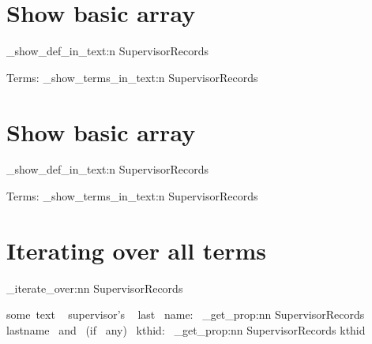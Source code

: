 \documentclass{article}
\begin{document}
\section{Show basic array}
\ExplSyntaxOn
\starray_show_def_in_text:n {SupervisorRecords}\\
\par Terms:
\starray_show_terms_in_text:n {SupervisorRecords}\\
\ExplSyntaxOff


\section{Show basic array}
\ExplSyntaxOn
\starray_show_def_in_text:n {SupervisorRecords}\\
\par Terms:
\starray_show_terms_in_text:n {SupervisorRecords}\\
\ExplSyntaxOff


\section{Iterating over all terms}
\ExplSyntaxOn
\starray_iterate_over:nn {SupervisorRecords}
  {
    \noindent some~text ~ supervisor's ~ last ~name:~ \starray_get_prop:nn {SupervisorRecords} {lastname} ~and~ (if~ any)~ kthid:~ \starray_get_prop:nn {SupervisorRecords} {kthid} \par
  }
\ExplSyntaxOff
\end{document}
